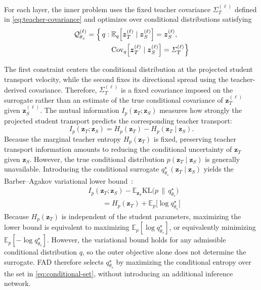 \documentclass[letterpaper]{article} %
\newcommand{\E}{\mathbb{E}}
\newcommand{\calQ}{\mathcal{Q}}
\newcommand{\KL}{\mathrm{KL}}
\newcommand{\Cov}{\mathrm{Cov}}
\newcommand{\bz}{\boldsymbol{z}}
\newcommand{\bSigma}{\varSigma}
\theoremstyle{plain}
\theoremstyle{definition}
\begin{document}
For each layer, the inner problem uses the fixed teacher covariance $\bSigma_T^{(\ell)}$ defined in
\eqref{eq:teacher-covariance} and optimizes over conditional distributions
satisfying
\begin{equation}
\begin{aligned}
  \calQ_{\theta_s}^{(\ell)}
  =
  \Bigl\{\, q:\;
    &\E_q\!\left[
      \bz_T^{(\ell)}
      \mid
      \bz_S^{(\ell)}
    \right]
    =
    \bz_S^{(\ell)},\\
    &\Cov_q\!\left[
      \bz_T^{(\ell)}
      \mid
      \bz_S^{(\ell)}
    \right]
    =
    \bSigma_T^{(\ell)}
  \Bigr\}
\end{aligned}
\label{eq:conditional-set}
\end{equation}

The first constraint centers the conditional distribution at the projected student transport velocity, while the second fixes its directional spread using the teacher-derived covariance. Therefore, $\bSigma_T^{(\ell)}$ is a fixed covariance imposed on the surrogate rather than an estimate of the true conditional covariance of $\bz_T^{(\ell)}$ given $\bz_S^{(\ell)}$.
The mutual information $I_p(\bz_T;\bz_S)$ measures how strongly the projected student transport predicts the corresponding teacher transport:
\[
I_p(\bz_T;\bz_S)
=
H_p(\bz_T)
-
H_p(\bz_T\!\mid\!\bz_S).
\]
Because the marginal teacher entropy $H_p(\bz_T)$ is  fixed, preserving teacher transport information amounts to reducing the conditional uncertainty of $\bz_T$ given $\bz_S$. However, the true conditional distribution $p(\bz_T\!\mid\!\bz_S)$ is generally unavailable. Introducing the conditional surrogate $q_{\theta_s}^{\star}(\bz_T\!\mid\!\bz_S)$ yields the Barber--Agakov variational lower bound~\citep{barber2003im,poole2019variational}:
\begin{equation}
\begin{aligned}
  &I_p(\bz_T;\bz_S)
  -
  \E_{\bz_S}
  \KL\!\bigl(
    p
    \,\big\|\,
    q^\star_{\theta_s}
  \bigr)\\
  &\qquad =
  H_p(\bz_T)
  +
  \E_p\!\bigl[
    \log q^\star_{\theta_s}
  \bigr]
\end{aligned}
\label{eq:ba}
\end{equation}
Because $H_p(\bz_T)$ is independent of the student parameters, maximizing the lower bound is equivalent to maximizing $\E_p[\log q^\star_{\theta_s}]$, or equivalently minimizing $\E_p[-\log q^\star_{\theta_s}]$.
However, the variational bound holds for any admissible conditional distribution $q$, so the outer objective alone does not determine the surrogate. FAD therefore selects $q_{\theta_s}^{\star}$ by maximizing the conditional entropy over the set in \eqref{eq:conditional-set}, without introducing an additional inference network.
\end{document}
